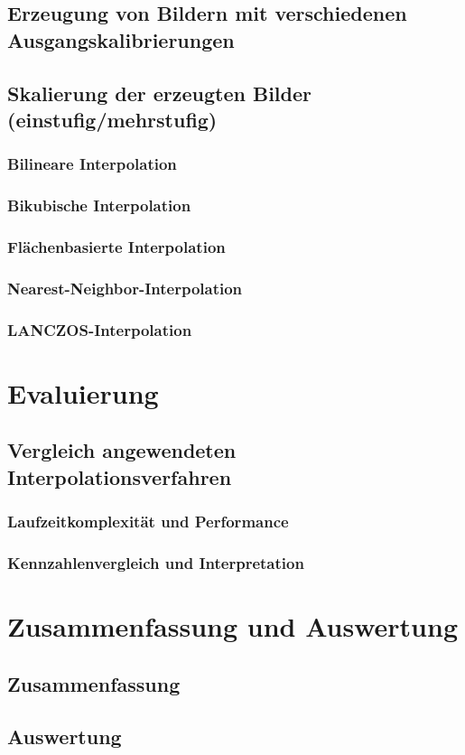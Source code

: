 \documentclass[
fontsize=10pt, 
listof = totoc,
parskip = half	
]{report}
\begin{document}
\section{Erzeugung von Bildern mit verschiedenen Ausgangskalibrierungen}

\section{Skalierung der erzeugten Bilder (einstufig/mehrstufig)}

\subsection{Bilineare Interpolation}

\subsection{Bikubische Interpolation}

\subsection{Flächenbasierte Interpolation}

\subsection{Nearest-Neighbor-Interpolation}

\subsection{LANCZOS-Interpolation}



\chapter{Evaluierung}

\section{Vergleich angewendeten Interpolationsverfahren}

\subsection{Laufzeitkomplexität und Performance}

\subsection{Kennzahlenvergleich und Interpretation}




\chapter{Zusammenfassung und Auswertung}
\section{Zusammenfassung}
\section{Auswertung}
\end{document}
